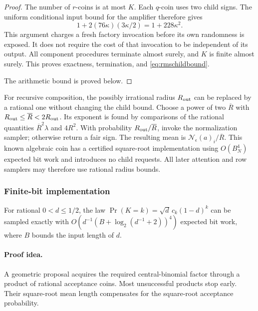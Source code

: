 \begin{proof}
The number of $r$-coins is at most $K$. Each $q$-coin uses two
child signs. The uniform conditional input bound for the amplifier
therefore gives
\[
 1+2(76\kappa)(3\kappa/2)=1+228\kappa^2.
\]
This argument charges a fresh factory invocation before its own
randomness is exposed. It does not require the cost of that
invocation to be independent of its output. All component
procedures terminate almost surely, and $K$ is finite almost
surely. This proves exactness, termination, and
\eqref{eq:rmschildbound}.

The arithmetic bound is proved below.
\end{proof}

For recursive composition, the possibly irrational radius
$R_{\rm out}$ can be replaced by a rational one without changing
the child bound. Choose a power of two $\overline R$ with
$R_{\rm out}\le\overline R<2R_{\rm out}$. Its exponent is
found by comparisons of the rational quantities
$\overline R^2\lambda$ and $4R^2$. With probability
$R_{\rm out}/\overline R$, invoke the normalization sampler;
otherwise return a fair sign. The resulting mean is
$\mathcal N_\epsilon(a)_i/\overline R$. This known algebraic
coin has a certified square-root implementation using
$O(B_N^4)$ expected bit work and introduces no child requests.
All later attention and row samplers may therefore use rational
radius bounds.

\subsubsection{Finite-bit implementation}

\begin{lemma}
\label{lem:rmshalfnb}
For rational $0<d\le1/2$, the law
$\Pr(K=k)=\sqrt d\,c_k(1-d)^k$ can be sampled exactly with
$O(d^{-1}(B+\log_2(d^{-1}+2))^4)$ expected bit work, where $B$
bounds the input length of $d$.
\end{lemma}
\paragraph{Proof idea.}
A geometric proposal acquires the required central-binomial factor
through a product of rational acceptance coins. Most unsuccessful products
stop early. Their square-root mean length compensates for the square-root
acceptance probability.

